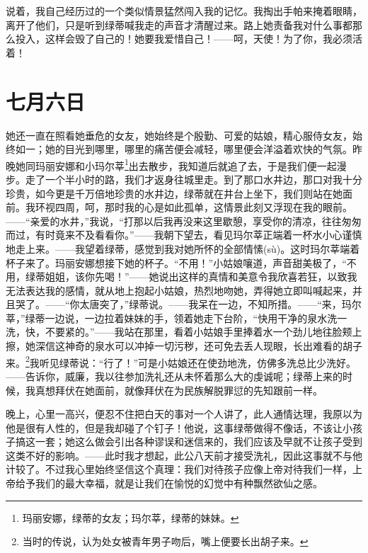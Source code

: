 \documentclass[12pt,oneside]{book}
\begin{document}
说着，我自己经历过的一个类似情景猛然闯入我的记忆。我掏出手帕来掩着眼睛，离开了他们，只是听到绿蒂喊我走的声音才清醒过来。路上她责备我对什么事都那么投入，这样会毁了自己的！她要我爱惜自己！——呵，天使！为了你，我必须活着！

\chapter{七月六日}
\label{sec-2-16}
她还一直在照看她垂危的女友，她始终是个殷勤、可爱的姑娘，精心服侍女友，始终如一；她的目光到哪里，哪里的痛苦便会减轻，哪里便会洋溢着欢快的气氛。昨晚她同玛丽安娜和小玛尔莘\footnote{玛丽安娜，绿蒂的女友；玛尔莘，绿蒂的妹妹。}出去散步，我知道后就追了去，于是我们便一起漫步。走了一个半小时的路，我们才返身往城里走。到了那口水井边，那口对我十分珍贵，如今更是千万倍地珍贵的水井边，绿蒂就在井台上坐下，我们则站在她面前。我环视四周，呵，那时我的心是如此孤单，这情景此刻又浮现在我的眼前。——“亲爱的水井，”我说，“打那以后我再没来这里歇憩，享受你的清凉，往往匆匆而过，有时竟来不及看看你。”——我朝下望去，看见玛尔莘正端着一杯水小心谨慎地走上来。——我望着绿蒂，感觉到我对她所怀的全部情愫(sù)。这时玛尔莘端着杯子来了。玛丽安娜想接下她的杯子。“不用！”小姑娘嚷道，声音甜美极了，“不用，绿蒂姐姐，该你先喝！”——她说出这样的真情和美意令我欣喜若狂，以致我无法表达我的感情，就从地上抱起小姑娘，热烈地吻她，弄得她立即叫喊起来，并且哭了。——“你太唐突了，”绿蒂说。——我呆在一边，不知所措。——“来，玛尔莘，”绿蒂一边说，一边拉着妹妹的手，领着她走下台阶，“快用干净的泉水洗一洗，快，不要紧的。”——我站在那里，看着小姑娘手里捧着水一个劲儿地往脸颊上擦，她深信这神奇的泉水可以冲掉一切污秽，还可免去丢人现眼，长出难看的胡子来。\footnote{当时的传说，认为处女被青年男子吻后，嘴上便要长出胡子来。}我听见绿蒂说：“行了！”可是小姑娘还在使劲地洗，仿佛多洗总比少洗好。——告诉你，威廉，我以往参加洗礼还从未怀着那么大的虔诚呢；绿蒂上来的时候，我真想拜伏在她面前，就像拜伏在为民族解脱罪愆的先知跟前一样。

晚上，心里一高兴，便忍不住把白天的事对一个人讲了，此人通情达理，我原以为他是很有人性的，但是我却碰了个钉子！他说，这事绿蒂做得不像话，不该让小孩子搞这一套；她这么做会引出各种谬误和迷信来的，我们应该及早就不让孩子受到这类不好的影响。——此时我才想起，此公八天前才接受洗礼，因此这事就不与他计较了。不过我心里始终坚信这个真理：我们对待孩子应像上帝对待我们一样，上帝给予我们的最大幸福，就是让我们在愉悦的幻觉中有种飘然欲仙之感。
\end{document}
